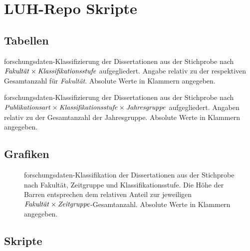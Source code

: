 \chapter{LUH-Repo Skripte}
\section{Tabellen}
\begin{table}[!htbp]
	\caption{\gls{forschungsdaten}-Klassifizierung der Dissertationen aus der Stichprobe nach $\text{\textit{Fakultät}}\times\text{\textit{Klassifikationsstufe}}$ aufgegliedert.
    Angabe relativ zu der respektiven Gesamtanzahl für \textit{Fakultät}.
    Absolute Werte in Klammern angegeben.}
    
    \label{tab:luh-repo-classification-general-all-faculty}
\end{table}

\begin{table}[!htbp]
	\caption{\gls{forschungsdaten}-Klassifizierung der Dissertationen aus der Stichprobe nach $\text{\textit{Publikationsart}}\times\text{\textit{Klassifikationsstufe}}\times\text{\textit{Jahresgruppe}}$ aufgegliedert.
    Angaben relativ zu der Gesamtanzahl der Jahresgruppe.
    Absolute Werte in Klammern angegeben.}
    
    \label{tab:luh-repo-classification-general-publication}
\end{table}
\section{Grafiken}
\begin{figure}[!htbp]
    \resizebox{\ifdim\width>\textwidth\textwidth\else\width\fi}{!}{}
    \caption{\gls{forschungsdaten}-Klassifikation der Dissertationen aus der Stichprobe nach Fakultät, Zeitgruppe und Klassifikationsstufe.
    Die Höhe der Barren entsprechen dem relativen Anteil zur jeweiligen $\text{\textit{Fakultät}}\times\text{\textit{Zeitgruppe}}$-Gesamtanzahl.
    Absolute Werte in Klammern angegeben.}
    \label{fig:luh-repo-faculty-yeargroup-classification}
    \end{figure}
\section{Skripte}




